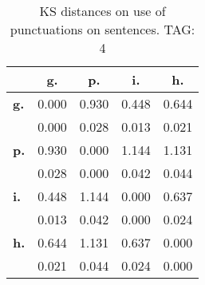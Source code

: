 \begin{table}[h!]
\begin{center}
\begin{tabular}{| l || c | c | c | c |}\hline
 & {\bf g.} & {\bf p.} & {\bf i.} & {\bf h.} \\\hline\hline
{\bf g.} & 0.000 & 0.930 & 0.448 & 0.644 \\
{\bf } & 0.000 & 0.028 & 0.013 & 0.021 \\\hline
{\bf p.} & 0.930 & 0.000 & 1.144 & 1.131 \\
{\bf } & 0.028 & 0.000 & 0.042 & 0.044 \\\hline
{\bf i.} & 0.448 & 1.144 & 0.000 & 0.637 \\
{\bf } & 0.013 & 0.042 & 0.000 & 0.024 \\\hline
{\bf h.} & 0.644 & 1.131 & 0.637 & 0.000 \\
{\bf } & 0.021 & 0.044 & 0.024 & 0.000 \\\hline
\end{tabular}
\caption{KS distances on use of punctuations on sentences. TAG: 4}
\end{center}
\end{table}